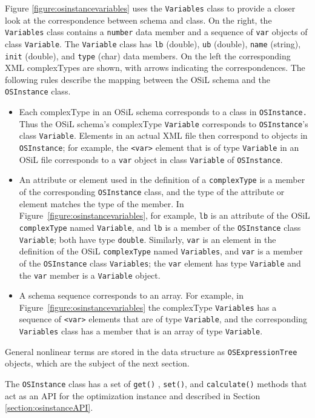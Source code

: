 \documentclass[11pt]{article}
\newcounter{Fig}
\renewcommand{\_}{{\char"5F}}
\renewcommand{\{}{{\char"7B}}
\renewcommand{\}}{{\char"7D}}
\renewcommand{\^}{{\char"0D}}
\renewcommand{\'}{{\char"0D}}
\newcommand{\Titem}{\item[$\triangleright$]}
\begin{document}
     Figure \ref{figure:osinstancevariables} uses the {\tt Variables} class to provide a closer look at the correspondence between schema and class. On the right, the {\tt Variables} class contains a {\tt number} data member and a sequence of {\tt var} objects of class {\tt Variable}. The {\tt Variable} class has {\tt lb} (double), {\tt ub} (double), {\tt name} (string), {\tt init} (double), and {\tt type} (char) data members. On the left the corresponding XML complexTypes are shown, with arrows indicating the correspondences. The following rules describe the mapping between the OSiL schema and the {\tt OSInstance} class.
%
\begin{itemize}

\Titem  Each complexType in an OSiL schema corresponds to a class in {\tt OSInstance.} Thus the OSiL schema's complexType {\tt Variable} corresponds to {\tt OSInstance}'s class {\tt Variable}.  Elements in an actual XML file then correspond to objects in {\tt OSInstance}; for example, the {\tt <var>} element that is of type {\tt Variable} in an OSiL file corresponds to a {\tt var} object in class {\tt Variable} of {\tt OSInstance}.

\Titem An attribute or element used in the definition of a {\tt complexType} is a member of the corresponding {\tt OSInstance} class, and the type of the attribute or element matches the type of the member.  In Figure~\ref{figure:osinstancevariables}, for example, {\tt lb} is an attribute of the OSiL {\tt complexType} named {\tt Variable}, and {\tt lb} is a member of the {\tt OSInstance} class {\tt Variable}; both have type {\tt double}.  Similarly, {\tt var} is an element in the definition of the OSiL {\tt complexType} named {\tt Variables}, and {\tt var} is a member of the {\tt OSInstance} class {\tt Variables}; the {\tt var} element has type {\tt Variable} and the {\tt var} member is a {\tt Variable} object.

\Titem A schema sequence corresponds to an array. For example, in Figure~\ref{figure:osinstancevariables} the complexType {\tt Variables} has a sequence of {\tt <var>} elements that are of type {\tt Variable}, and the corresponding {\tt Variables} class has a member that is an array of type {\tt Variable}.

\end{itemize}
%
General nonlinear terms are stored in the data structure as {\tt OSExpressionTree} objects, which are the subject of the next section.

     The {\tt OSInstance} class has a set of {\tt get()} , {\tt set()}, and {\tt calculate()} methods that act as an API for the optimization instance and described in Section \ref{section:osinstanceAPI}.
\end{document}
